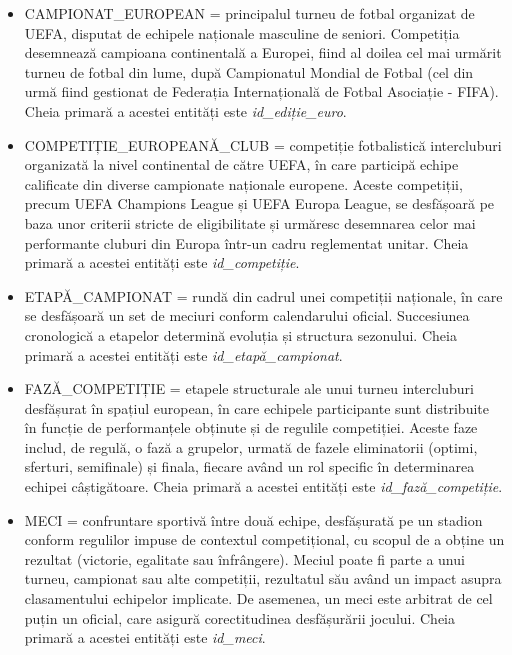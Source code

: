 \documentclass{article}
\begin{document}
\begin{itemize}
	\item CAMPIONAT\_EUROPEAN = principalul turneu de fotbal organizat de UEFA, disputat de echipele naționale masculine de seniori. Competiția desemnează campioana continentală a Europei, fiind al doilea cel mai urmărit turneu de fotbal din lume, după Campionatul Mondial de Fotbal (cel din urmă fiind gestionat de Federația Internațională de Fotbal Asociație - FIFA). Cheia primară a acestei entități este \textit{id\_ediție\_euro}.
	
	\item COMPETIȚIE\_EUROPEANĂ\_CLUB = competiție fotbalistică intercluburi organizată la nivel continental de către UEFA, în care participă echipe calificate din diverse campionate naționale europene. Aceste competiții, precum UEFA Champions League și UEFA Europa League, se desfășoară pe baza unor criterii stricte de eligibilitate și urmăresc desemnarea celor mai performante cluburi din Europa într-un cadru reglementat unitar. Cheia primară a acestei entități este \textit{id\_competiție}. 
	
	\item ETAPĂ\_CAMPIONAT = rundă din cadrul unei competiții naționale, în care se desfășoară un set de meciuri conform calendarului oficial. Succesiunea cronologică a etapelor determină evoluția și structura sezonului. Cheia primară a acestei entități este \textit{id\_etapă\_campionat}.
	
	\item FAZĂ\_COMPETIȚIE = etapele structurale ale unui turneu intercluburi desfășurat în spațiul european, în care echipele participante sunt distribuite în funcție de performanțele obținute și de regulile competiției. Aceste faze includ, de regulă, o fază a grupelor, urmată de fazele eliminatorii (optimi, sferturi, semifinale) și finala, fiecare având un rol specific în determinarea echipei câștigătoare. Cheia primară a acestei entități este \textit{id\_fază\_competiție}.
	
	\item MECI = confruntare sportivă între două echipe, desfășurată pe un stadion conform regulilor impuse de contextul competițional, cu scopul de a obține un rezultat (victorie, egalitate sau înfrângere). Meciul poate fi parte a unui turneu, campionat sau alte competiții, rezultatul său având un impact asupra clasamentului echipelor implicate. De asemenea, un meci este arbitrat de cel puțin un oficial, care asigură corectitudinea desfășurării jocului. Cheia primară a acestei entități este \textit{id\_meci}.
	

\end{itemize}
\end{document}
